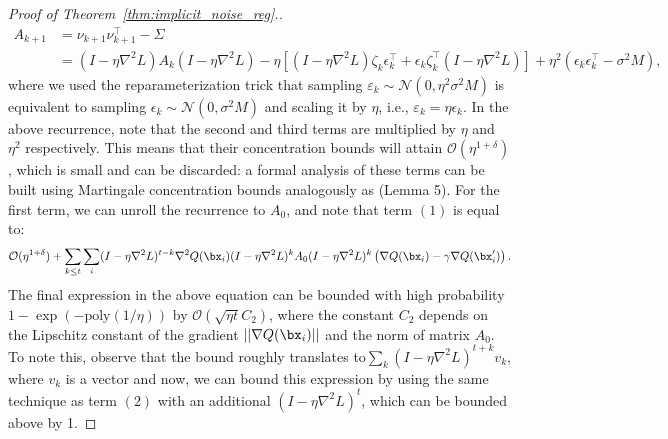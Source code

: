 \begin{proof}[Proof of Theorem~\ref{thm:implicit_noise_reg}.]
\begin{align*}
    A_{k+1} &= \nu_{k+1} \nu_{k+1}^\top - \Sigma \\
    &= (I - \eta \nabla^2 L) A_{k} (I - \eta \nabla^2 L) - \eta \left[ (I - \eta \nabla^2 L) \zeta_k \epsilon_k^\top + \epsilon_k \zeta_k^\top (I - \eta \nabla^2 L) \right] + \eta^2 (\epsilon_k \epsilon_k^\top - \sigma^2 M), 
\end{align*}
where we used the reparameterization trick that sampling $\varepsilon_k \sim \mathcal{N}(0, \eta^2 \sigma^2 M)$ is equivalent to sampling $\epsilon_k \sim \mathcal{N}(0, \sigma^2 M)$ and scaling it by $\eta$, i.e., $\varepsilon_k = \eta \epsilon_k$. In the above recurrence, note that the second and third terms are multiplied by $\eta$ and $\eta^2$ respectively. This means that their concentration bounds will attain $\mathcal{O}(\eta^{1 + \delta})$, which is small and can be discarded: a formal analysis of these terms can be built using Martingale concentration bounds analogously as \citet{blanc2020implicit} (Lemma 5). For the first term, we can unroll the recurrence to $A_0$, and note that term $(1)$ is equal to:
\begin{equation}
\label{eqn:solving_eqn1}
    \mathcal{O}(\eta^{1 + \delta}) + \sum_{k \leq t} \sum_i (I - \eta \nabla^2 L)^{t -k} \nabla^2 Q(\bx_i) (I - \eta \nabla^2 L)^k A_0 (I - \eta \nabla^2 L)^k \left(\nabla Q(\bx_i) - \gamma \nabla Q(\bx'_i) \right).
\end{equation}
The final expression in the above equation can be bounded with high probability $1 - \exp(-\text{poly}(1/\eta))$ by $\mathcal{O}(\sqrt{\eta t} C_2)$, where the constant $C_2$ depends on the Lipschitz constant of the gradient $||\nabla Q(\bx_i)||$ and the norm of matrix $A_0$. To note this, observe that the bound roughly translates to$\sum_{k} (I - \eta \nabla^2 L)^{t+k} v_k$, where $v_k$ is a vector and now, we can bound this expression by using the same technique as term $(2)$ with an additional $(I - \eta \nabla^2 L)^t$, which can be bounded above by 1.


\end{proof}
